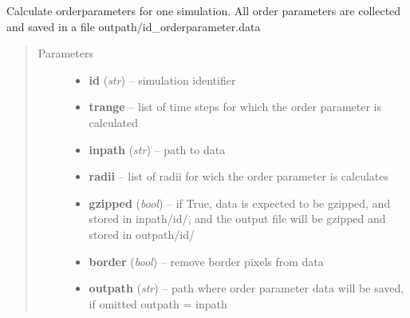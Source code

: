 \documentclass[letterpaper,10pt,english]{sphinxmanual}
\begin{document}
\begin{fulllineitems}
\label{CC3DPipeline:CC3DPipeline.getOrderParameterForSim}
Calculate orderparameters for one simulation. All order parameters are collected and saved in a file outpath/id\_orderparameter.data
\begin{quote}\begin{description}
\item[{Parameters}] \leavevmode\begin{itemize}
\item {} 
\textbf{id} (\emph{str}) -- simulation identifier

\item {} 
\textbf{trange} -- list of time steps for which the order parameter is calculated

\item {} 
\textbf{inpath} (\emph{str}) -- path to data

\item {} 
\textbf{radii} -- list of radii for wich the order parameter is calculates

\item {} 
\textbf{gzipped} (\emph{bool}) -- if True, data is expected to be gzipped, and stored in inpath/id/, and the output file will be gzipped and stored in outpath/id/

\item {} 
\textbf{border} (\emph{bool}) -- remove border pixels from data

\item {} 
\textbf{outpath} (\emph{str}) -- path where order parameter data will be saved, if omitted outpath = inpath

\end{itemize}

\end{description}\end{quote}




{\hyperref[AnalysisUtils:AnalysisUtils.getOrderParameter]{}}



\end{fulllineitems}

\end{document}
